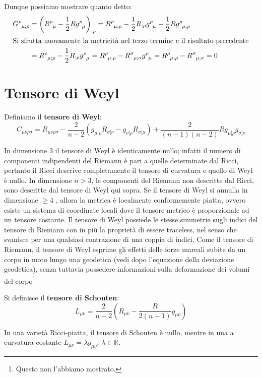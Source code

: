 Dunque possiamo mostrare quanto detto:
\begin{align*}
    \tensor{G}{^\rho_{\mu;\rho}} &= \left( \tensor{R}{^\rho_\mu} - \frac{1}{2}R \tensor{g}{^\rho_\mu} \right)_{;\rho} = \tensor{R}{^\rho_{\mu;\rho}} - \frac{1}{2} R_{;\rho} \tensor{g}{^\rho_\mu} - \frac{1}{2} R \tensor{g}{^\rho_{\mu;\rho}} \\
\intertext{Si sfrutta nuovamente la metricità nel terzo termine e il risultato precedente}
    &= \tensor{R}{^\rho_{\mu;\rho}} - \frac{1}{2} R_{;\rho} \tensor{g}{^\rho_\mu} =  \tensor{R}{^\rho_{\mu;\rho}} -  \tensor{R}{^\sigma_{\rho;\sigma}} \tensor{g}{^\rho_\mu} = \tensor{R}{^\rho_{\mu;\rho}} - \tensor{R}{^\sigma_{\mu;\sigma}} = 0
\end{align*}

\section{Tensore di Weyl}
\begin{definizione}
    Definiamo il \textbf{tensore di Weyl}:
    \begin{equation}
        C_{\mu\nu\rho\sigma} = R_{\mu\nu\rho\sigma} - \frac{2}{n-2}\left( g_{\mu[\rho} R_{\sigma]\nu} - g_{\nu[\rho} R_{\sigma]\mu}\right) + \frac{2}{(n-1)(n-2)} R g_{\mu[\rho} g_{\sigma]\nu}
        \label{eq.tensore_weyl}
    \end{equation}
\end{definizione}
In dimensione 3 il tensore di Weyl è identicamente nullo; infatti il numero di componenti indipendenti del Riemann è pari a quelle determinate dal Ricci, pertanto il Ricci descrive completamente il tensore di curvatura e quello di Weyl è nullo. In dimensione $n>3$, le componenti del Riemann non descritte dal Ricci, sono descritte dal tensore di Weyl qui sopra.
Se il tensore di Weyl si annulla in dimensione $\geq 4$ , allora la metrica è localmente conformemente piatta, ovvero esiste un sistema di coordinate locali dove il tensore metrico è proporzionale ad un tensore costante. Il tensore di Weyl possiede le stesse simmetrie sugli indici del tensore di Riemann con in più la proprietà di essere traceless, nel senso che svanisce per una qualsiasi contrazione di una coppia di indici. Come il tensore di Riemann, il tensore di Weyl esprime gli effetti delle forze mareali subite da un corpo in moto lungo una geodetica (vedi dopo l'equazione della deviazione geodetica), senza tuttavia possedere informazioni sulla deformazione dei volumi del corpo\footnote{Questo non l'abbiamo mostrato.}
\begin{definizione}
    Si definisce il \textbf{tensore di Schouten}:
    \begin{equation}
        L_{\mu\nu} = \frac{2}{n-2}\left( R_{\mu\nu} - \frac{R}{2(n-1)}g_{\mu\nu} \right)
        \label{eq.tensore_schouten}
    \end{equation}
\end{definizione}
In una varietà Ricci-piatta, il tensore di Schouten è nullo, mentre in una a curvatura costante $L_{\mu\nu} = \lambda g_{\mu\nu}$, $\lambda \in \mathbb R$.

